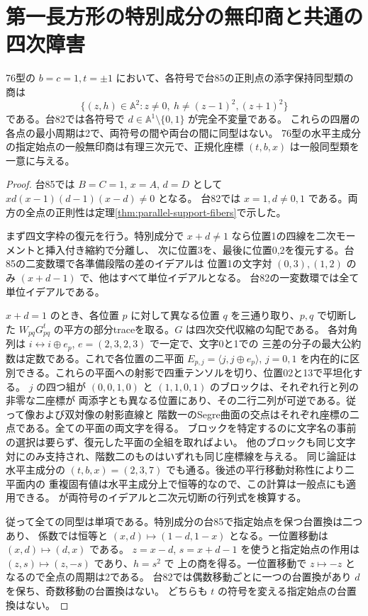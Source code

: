 \section{第一長方形の特別成分の無印商と共通の四次障害}
\label{sec:first-rectangle-orbits}
\begin{theorem}\label{thm:first-rectangle-orbits}
76型の $b=c=1,t=\pm1$ において、各符号で台85の正則点の添字保持同型類の商は
\[
 \{(z,h)\in\mathbb A^2:z\ne0,\ h\ne(z-1)^2,(z+1)^2\}
\]
である。台82では各符号で $d\in\mathbb A^1\setminus\{0,1\}$ が完全不変量である。
これらの四層の各点の最小周期は2で、両符号の間や両台の間に同型はない。
76型の水平主成分の指定始点の一般無印商は有理三次元で、正規化座標 $(t,b,x)$ は一般同型類を一意に与える。
\end{theorem}
\begin{proof}
台85では $B=C=1$, $x=A$, $d=D$ として $xd(x-1)(d-1)(x-d)\ne0$ となる。
台82では $x=1,d\ne0,1$ である。両方の全点の正則性は定理\ref{thm:parallel-support-fibers}で示した。

まず四文字枠の復元を行う。特別成分で $x+d\ne1$ なら位置1の四線を二次モーメントと挿入付き縮約で分離し、
次に位置3を、最後に位置0,2を復元する。台85の二変数環で各準備段階の差のイデアルは
位置1の文字対 $(0,3),(1,2)$ のみ $(x+d-1)$ で、他はすべて単位イデアルとなる。
台82の一変数環では全て単位イデアルである。

$x+d=1$ のとき、各位置 $p$ に対して異なる位置 $q$ を三通り取り、$p,q$ で切断した
$W_{pq}G_{pq}^t$ の平方の部分traceを取る。$G$ は四次交代収縮の勾配である。
各対角列は $i\leftrightarrow i\mathbin\oplus e_p$, $e=(2,3,2,3)$ で一定で、文字0と1での
三差の分子の最大公約数は定数である。これで各位置の二平面 $E_{p,j}=\langle j,j\oplus e_p\rangle$,
$j=0,1$ を内在的に区別できる。これらの平面への射影で四重テンソルを切り、位置02と13で平坦化する。
$j$ の四つ組が $(0,0,1,0)$ と $(1,1,0,1)$ のブロックは、それぞれ行と列の非零な二座標が
両添字とも異なる位置にあり、その二行二列が可逆である。従って像および双対像の射影直線と
階数一のSegre曲面の交点はそれぞれ座標の二点である。全ての平面の両文字を得る。
ブロックを特定するのに文字名の事前の選択は要らず、復元した平面の全組を取ればよい。
他のブロックも同じ文字対にのみ支持され、階数二のものはいずれも同じ座標線を与える。
同じ論証は水平主成分の $(t,b,x)=(2,3,7)$ でも通る。後述の平行移動対称性により二平面内の
重複固有値は水平主成分上で恒等的なので、この計算は一般点にも適用できる。
 が両符号のイデアルと二次元切断の行列式を検算する。

従って全ての同型は単項である。特別成分の台85で指定始点を保つ台置換は二つあり、
係数では恒等と $(x,d)\mapsto(1-d,1-x)$ となる。一位置移動は $(x,d)\mapsto(d,x)$ である。
$z=x-d$, $s=x+d-1$ を使うと指定始点の作用は $(z,s)\mapsto(z,-s)$ であり、$h=s^2$ で
上の商を得る。一位置移動で $z\mapsto-z$ となるので全点の周期は2である。
台82では偶数移動ごとに一つの台置換があり $d$ を保ち、奇数移動の台置換はない。
どちらも $t$ の符号を変える指定始点の台置換はない。


\end{proof}
